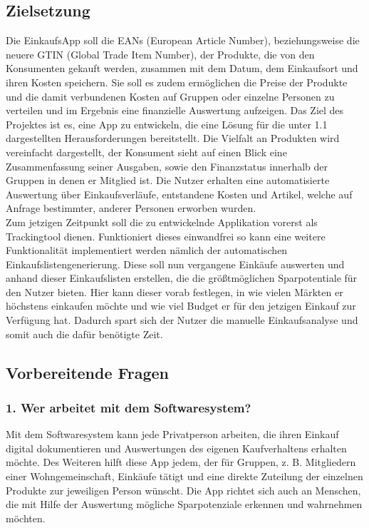 \documentclass[12pt,a4paper]{article}
\begin{document}
\subsection{Zielsetzung}
Die EinkaufsApp soll die EANs (European Article Number), beziehungsweise die neuere GTIN (Global Trade Item Number), der Produkte, die von den Konsumenten gekauft werden, zusammen mit dem Datum, dem Einkaufsort und ihren Kosten speichern.
Sie soll es zudem ermöglichen die Preise der Produkte und die damit verbundenen Kosten auf Gruppen oder einzelne Personen zu verteilen und im Ergebnis eine finanzielle Auswertung aufzeigen.
Das Ziel des Projektes ist es, eine App zu entwickeln, die eine Lösung für die unter 1.1 dargestellten Herausforderungen bereitstellt. 
Die Vielfalt an Produkten wird vereinfacht dargestellt, der Konsument sieht auf einen Blick eine Zusammenfassung seiner Ausgaben, sowie den Finanzstatus innerhalb der Gruppen in denen er Mitglied ist. Die Nutzer erhalten eine automatisierte Auswertung über Einkaufsverläufe, entstandene Kosten und Artikel, welche auf Anfrage bestimmter, anderer Personen erworben wurden.
\\
Zum jetzigen Zeitpunkt soll die zu entwickelnde Applikation vorerst als Trackingtool dienen. Funktioniert dieses einwandfrei so kann eine weitere Funktionalität implementiert werden nämlich der automatischen Einkaufslistengenerierung. Diese soll nun vergangene Einkäufe auswerten und anhand dieser Einkaufslisten erstellen, die die größtmöglichen Sparpotentiale für den Nutzer bieten. Hier kann dieser vorab festlegen, in wie vielen Märkten er höchstens einkaufen möchte und wie viel Budget er für den jetzigen Einkauf zur Verfügung hat. Dadurch spart sich der Nutzer die manuelle Einkaufsanalyse und somit auch die dafür benötigte Zeit.

\newpage
\subsection{Vorbereitende Fragen}
\subsubsection*{1. Wer arbeitet mit dem Softwaresystem?}
Mit dem Softwaresystem kann jede Privatperson arbeiten, die ihren Einkauf digital dokumentieren und Auswertungen des eigenen Kaufverhaltens erhalten möchte. 
Des Weiteren hilft diese App jedem, der für Gruppen, z. B. Mitgliedern einer Wohngemeinschaft, Einkäufe tätigt und eine direkte Zuteilung der einzelnen Produkte zur jeweiligen Person wünscht. 
Die App richtet sich auch an Menschen, die mit Hilfe der Auswertung mögliche Sparpotenziale erkennen und wahrnehmen möchten. 
\end{document}

